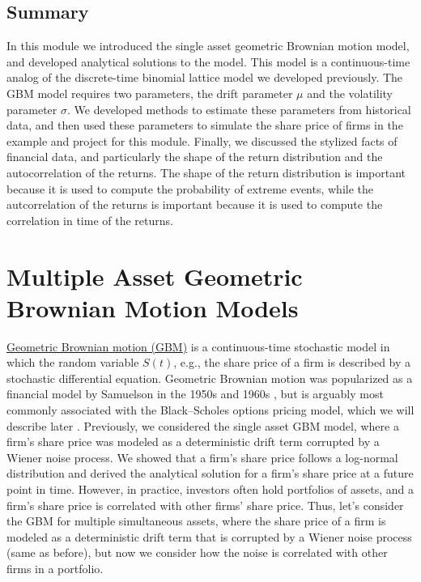 \documentclass[11pt]{article}
\theoremstyle{definition}
\begin{document}
\subsection{Summary}
In this module we introduced the single asset geometric Brownian motion model, and developed analytical solutions to the model.
This model is a continuous-time analog of the discrete-time binomial lattice model we developed previously.
The GBM model requires two parameters, the drift parameter $\mu$ and the volatility parameter $\sigma$. 
We developed methods to estimate these parameters from historical data, 
and then used these parameters to simulate the share price of firms in the example and project for this module.
Finally, we discussed the stylized facts of financial data, and particularly the shape of the return distribution and the autocorrelation of the returns.
The shape of the return distribution is important because it is used to compute the probability of extreme events, 
while the autcorrelation of the returns is important because it is used to compute the correlation in time of the returns. 

\section{Multiple Asset Geometric Brownian Motion Models}
\href{https://en.wikipedia.org/wiki/Geometric_Brownian_motion}{Geometric Brownian motion (GBM)} is a continuous-time stochastic model in which the random variable $S(t)$, 
e.g., the share price of a firm is described by a stochastic differential equation.
Geometric Brownian motion was popularized as a financial model by Samuelson in the 1950s and 1960s \cite{Merton2006}, 
but is arguably most commonly associated with the Black–Scholes options pricing model, which we will describe later 
\cite{BlackScholes1973}. Previously, we considered the single asset GBM model, 
where a firm's share price was modeled as a deterministic drift term corrupted by a Wiener noise process. 
We showed that a firm's share price follows a log-normal distribution and derived the analytical solution for a firm's share price at a future point in time.
However, in practice, investors often hold portfolios of assets, and a firm's share price is correlated with other firms' share price.
Thus, let's consider the GBM for multiple simultaneous assets, where the share price of a firm is modeled as a deterministic drift term 
that is corrupted by a Wiener noise process (same as before), but now we consider how the noise is correlated with other firms in a portfolio.
\end{document}
